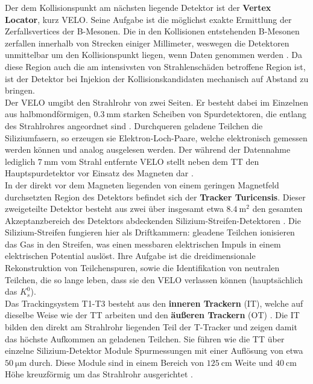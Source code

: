 %
Der dem Kollisionspunkt am nächsten liegende Detektor ist der \textbf{Vertex Locator}, kurz VELO. Seine Aufgabe ist die möglichst exakte Ermittlung der Zerfallsvertices der B-Mesonen. Die in den Kollisionen entstehenden B-Mesonen zerfallen innerhalb von Strecken einiger Millimeter, weswegen die Detektoren unmittelbar um den Kollisionspunkt liegen, wenn Daten genommen werden \cite{velo}. Da diese Region auch die am intensivsten von Strahlenschäden betroffene Region ist, ist der Detektor bei Injekion der Kollisionskandidaten mechanisch auf Abstand zu bringen.\\
Der VELO umgibt den Strahlrohr von zwei Seiten. Er besteht dabei im Einzelnen aus halbmondförmigen, $\SI{0.3}{\milli\meter}$ starken Scheiben von Spurdetektoren, die entlang des Strahlrohres angeordnet sind \cite{velo}. Durchqueren geladene Teilchen die Siliziumfasern, so erzeugen sie Elektron-Loch-Paare, welche elektronisch gemessen werden können und analog ausgelesen werden. Der während der Datennahme lediglich $\SI{7}{\milli\meter}$ vom Strahl entfernte VELO stellt neben dem TT den Hauptspurdetektor vor Einsatz des Magneten dar \cite{velo}. \\
%
In der direkt vor dem Magneten liegenden von einem geringen Magnetfeld durchsetzten Region des Detektors befindet sich der \textbf{Tracker Turicensis}. Dieser zweigeteilte Detektor besteht aus zwei über insgesamt etwa $\SI{8.4}{\meter\squared}$ den gesamten Akzeptanzbereich des Detektors abdeckenden Silizium-Streifen-Detektoren \cite{lhcb}. Die Silizium-Streifen fungieren hier als Driftkammern: gleadene Teilchen ionisieren das Gas in den Streifen, was einen messbaren elektrischen Impuls in einem elektrischen Potential auslöst. Ihre Aufgabe ist die dreidimensionale Rekonstruktion von Teilchenspuren, sowie die Identifikation von neutralen Teilchen, die so lange leben, dass sie den VELO verlassen können (hauptsächlich das $K_s^0$).\\
%
Das Trackingsystem T1-T3 besteht aus den \textbf{inneren Trackern} (IT), welche auf dieselbe Weise wie der TT arbeiten und den \textbf{äußeren Trackern} (OT) \cite{tracker}. Die IT bilden den direkt am Strahlrohr liegenden Teil der T-Tracker und zeigen damit das höchste Aufkommen an geladenen Teilchen. Sie führen wie die TT über einzelne Silizium-Detektor Module Spurmessungen mit einer Auflösung von etwa $\SI{50}{\micro\meter}$ durch. Diese Module sind in einem Bereich von $\SI{125}{\centi\meter}$ Weite und $\SI{40}{\centi\meter}$ Höhe kreuzförmig um das Strahlrohr ausgerichtet \cite{tracker}.\\
